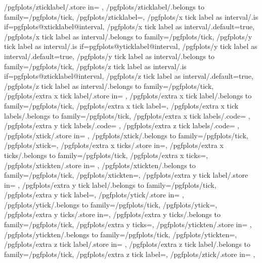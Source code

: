 {	/pgfplots/zticklabel/.store in=	\pgfplots@zticklabel,
	/pgfplots/zticklabel/.belongs to family=/pgfplots/tick,
	/pgfplots/zticklabel=,
	/pgfplots/x tick label as interval/.is if=pgfplots@xticklabel@interval,
	/pgfplots/x tick label as interval/.default=true,
	/pgfplots/x tick label as interval/.belongs to family=/pgfplots/tick,
	/pgfplots/y tick label as interval/.is if=pgfplots@yticklabel@interval,
	/pgfplots/y tick label as interval/.default=true,
	/pgfplots/y tick label as interval/.belongs to family=/pgfplots/tick,
	/pgfplots/z tick label as interval/.is if=pgfplots@zticklabel@interval,
	/pgfplots/z tick label as interval/.default=true,
	/pgfplots/z tick label as interval/.belongs to family=/pgfplots/tick,
	/pgfplots/extra x tick label/.store in=	\pgfplots@extra@xticklabel,
	/pgfplots/extra x tick label/.belongs to family=/pgfplots/tick,
	/pgfplots/extra x tick label=,
	/pgfplots/extra x tick labels/.belongs to family=/pgfplots/tick,
	/pgfplots/extra x tick labels/.code={%
		\pgfplotslistnew{}%
		\let\pgfplots@extra@xticklabel=\pgfplots@user@extra@ticklabel@list@x
	},
	/pgfplots/extra y tick labels/.code={%
		\pgfplotslistnew{}%
		\let\pgfplots@extra@yticklabel=\pgfplots@user@extra@ticklabel@list@y
	},
	/pgfplots/extra z tick labels/.code={%
		\pgfplotslistnew{}%
		\let\pgfplots@extra@zticklabel=\pgfplots@user@extra@ticklabel@list@z
	},
	/pgfplots/xtick/.store in=			\pgfplots@xtick,
	/pgfplots/xtick/.belongs to family=/pgfplots/tick,
	/pgfplots/xtick=,
	/pgfplots/extra x ticks/.store in=\pgfplots@extra@xtick,
	/pgfplots/extra x ticks/.belongs to family=/pgfplots/tick,
	/pgfplots/extra x ticks=,
	/pgfplots/xtickten/.store in=		\pgfplots@xtickten,
	/pgfplots/xtickten/.belongs to family=/pgfplots/tick,
	/pgfplots/xtickten=,
	/pgfplots/extra y tick label/.store in=	\pgfplots@extra@yticklabel,
	/pgfplots/extra y tick label/.belongs to family=/pgfplots/tick,
	/pgfplots/extra y tick label=,
	/pgfplots/ytick/.store in=			\pgfplots@ytick,
	/pgfplots/ytick/.belongs to family=/pgfplots/tick,
	/pgfplots/ytick=,
	/pgfplots/extra y ticks/.store in=\pgfplots@extra@ytick,
	/pgfplots/extra y ticks/.belongs to family=/pgfplots/tick,
	/pgfplots/extra y ticks=,
	/pgfplots/ytickten/.store in=		\pgfplots@ytickten,
	/pgfplots/ytickten/.belongs to family=/pgfplots/tick,
	/pgfplots/ytickten=,
	/pgfplots/extra z tick label/.store in=	\pgfplots@extra@zticklabel,
	/pgfplots/extra z tick label/.belongs to family=/pgfplots/tick,
	/pgfplots/extra z tick label=,
	/pgfplots/ztick/.store in=			\pgfplots@ztick,
}
